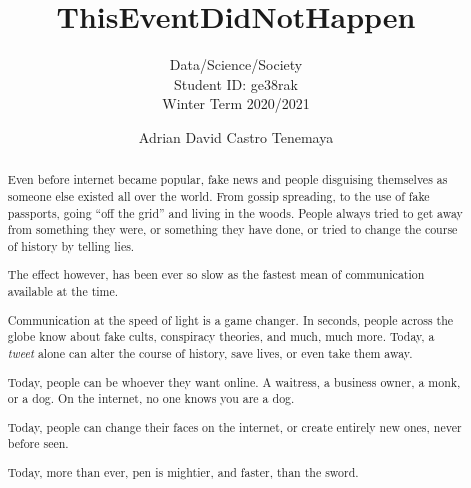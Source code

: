 \documentclass[sigconf,nonacm]{acmart}
\begin{document}
\title{ThisEventDidNotHappen}
\subtitle{Data/Science/Society \\ Student ID: ge38rak \\ Winter Term 2020/2021}

\author{Adrian David Castro Tenemaya}

\begin{abstract}
  Even before internet became popular, fake news and people disguising themselves as someone else existed all over the world. From gossip spreading, to the use of fake passports, going ``off the grid'' and living in the woods. People always tried to get away from something they were, or something they have done, or tried to change the course of history by telling lies.

  The effect however, has been ever so slow as the fastest mean of communication available at the time.

  Communication at the speed of light is a game changer. In seconds, people across the globe know about fake cults, conspiracy theories, and much, much more.
  Today, a \textit{tweet} alone can alter the course of history, save lives, or even take them away.

  Today, people can be whoever they want online. A waitress, a business owner, a monk, or a dog. On the internet, no one knows you are a dog.

  Today, people can change their faces on the internet, or create entirely new ones, never before seen.

  Today, more than ever, pen is mightier, and faster, than the sword.
\end{abstract}

\maketitle









\end{document}
